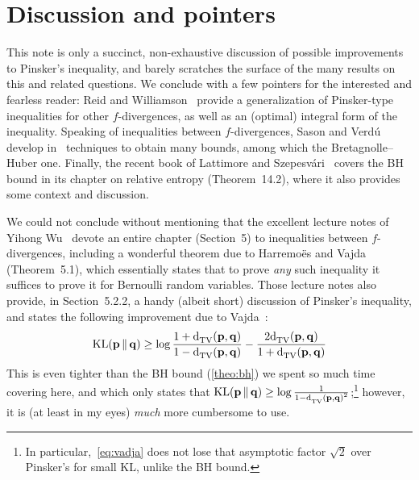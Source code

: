 \documentclass[10pt]{article}
\newcommand{\p}{\mathbf{p}}
\newcommand{\q}{\mathbf{q}}
\begin{document}
\section{Discussion and pointers}
  \label{sec:discussion}
This note is only a succinct, non-exhaustive discussion of possible improvements to Pinsker's inequality, and barely scratches the surface of the many results on this and related questions. We conclude with a few pointers for the interested and fearless reader: Reid and Williamson~\cite{ReidW09} provide a generalization of Pinsker-type inequalities for other $f$-divergences, as well as an  (optimal) integral form of the inequality. Speaking of inequalities between $f$-divergences, Sason and Verd\'u develop in~\cite{SasonV16} techniques to obtain many bounds, among which the Bretagnolle--Huber one. Finally, the recent book of Lattimore and Szepesv{\'a}ri~\cite{LaSze20} covers the BH bound in its chapter on relative entropy (Theorem~14.2), where it also provides some context and discussion.

We could not conclude without mentioning that the excellent lecture notes of Yihong Wu~\cite{Wu20} devote an entire chapter (Section~5) to inequalities between $f$-divergences, including a wonderful theorem due to Harremo\"es and Vajda (Theorem~5.1), which essentially states that to prove \emph{any} such inequality it suffices to prove it for Bernoulli random variables. Those lecture notes also provide, in Section~5.2.2, a handy (albeit short) discussion of Pinsker's inequality, and states the following improvement due to Vajda~\cite{Vajda70}:
\begin{equation}
  \label{eq:vadja}
  \kldiv{\p}{\q} \geq \log\frac{1+\totalvardist{\p}{\q}}{1-\totalvardist{\p}{\q}} - \frac{2\totalvardist{\p}{\q}}{1+\totalvardist{\p}{\q}}
\end{equation}
This is even tighter than the BH bound (\autoref{theo:bh}) we spent so much time covering here, and which only states that $\kldiv{\p}{\q} \geq \log\frac{1}{1-\totalvardist{\p}{\q}^2}$;\footnote{In particular,~\eqref{eq:vadja} does not lose that asymptotic factor $\sqrt{2}$ over Pinsker's for small KL, unlike the BH bound.} however, it is (at least in my eyes) \emph{much} more cumbersome to use.
\end{document}
